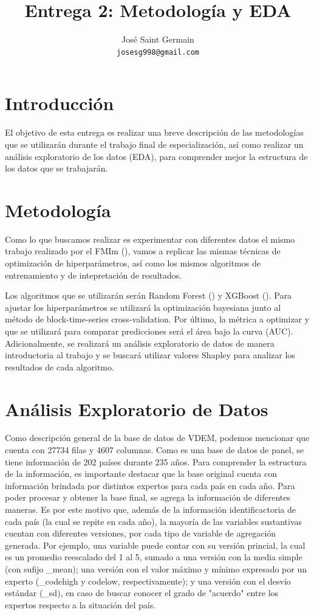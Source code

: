 \documentclass{article}
\title{Entrega 2: Metodología y EDA}
\author{%
  José Saint Germain\\
  \texttt{josesg998@gmail.com} \\
}
\begin{document}
\maketitle

\section{Introducción}
El objetivo de esta entrega es realizar una breve descripción de las metodologías que 
se utilizarán durante el trabajo final de especialización, así como realizar un 
análisis exploratorio de los datos (EDA), para comprender mejor la estructura de
los datos que se trabajarán.

\section{Metodología}
Como lo que buscamos realizar es experimentar con diferentes datos el mismo trabajo realizado
por el FMIm (\cite{Ceb24}), vamos a replicar las mismas técnicas de optimización de hiperparámetros, así como
los mismos algoritmos de entrenamiento y de intepretación de resultados.

Los algoritmos que se utilizarán serán Random Forest (\cite{Bre01}) y XGBoost
(\cite{Che16}). Para ajustar los hiperparámetros se utilizará la optimización
bayesiana junto al método de block-time-series cross-validation. Por último, la métrica a
optimizar y que se utilizará para comparar predicciones será el área bajo la curva (AUC).
Adicionalmente, se realizará un análisis exploratorio de datos de manera introductoria al
trabajo y se buscará utilizar valores Shapley para analizar los resultados de cada algoritmo.


\section{Análisis Exploratorio de Datos}

Como descripción general de la base de datos de VDEM, podemos mencionar que cuenta con 27734 filas y 4607 columnas. Como es una base de datos
de panel, se tiene información de 202 países durante 235 años. Para comprender la estructura de la información, es importante destacar que la base
original cuenta con información brindada por distintos expertos para cada país en cada año. Para poder procesar y obtener la base final, se agrega la información
de diferentes maneras. Es por este motivo que, además de la información identificactoria de cada país (la cual se repite en cada año), la mayoría de las variables
sustantivas cuentan con diferentes versiones, por cada tipo de variable de agregación generada. Por ejemplo, una variable puede contar con su versión princial, la cual
es un promedio reescalado del 1 al 5, sumado a una versión con la media simple (con sufijo _mean); una versión con el valor máximo y mínimo expresado por un experto
(_codehigh y codelow, respectivamente); y una versión con el desvío estándar (_sd), en caso de buscar conocer el grado de "acuerdo" entre los expertos respecto a
la situación del país.
\end{document}
